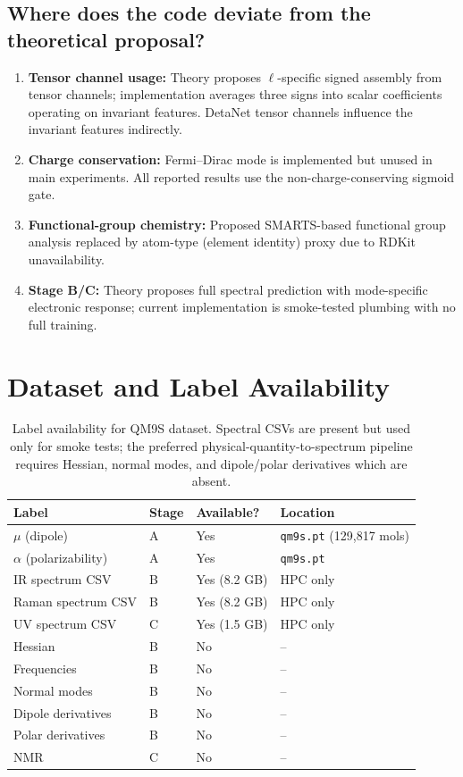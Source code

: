 \documentclass[11pt,a4paper]{article}
\begin{document}
\subsection{Where does the code deviate from the theoretical proposal?}
\begin{enumerate}[nosep]
    \item \textbf{Tensor channel usage:} Theory proposes $\ell$-specific signed assembly from tensor channels; implementation averages three signs into scalar coefficients operating on invariant features. DetaNet tensor channels influence the invariant features indirectly.
    \item \textbf{Charge conservation:} Fermi--Dirac mode is implemented but unused in main experiments. All reported results use the non-charge-conserving sigmoid gate.
    \item \textbf{Functional-group chemistry:} Proposed SMARTS-based functional group analysis replaced by atom-type (element identity) proxy due to RDKit unavailability.
    \item \textbf{Stage B/C:} Theory proposes full spectral prediction with mode-specific electronic response; current implementation is smoke-tested plumbing with no full training.
\end{enumerate}

\section{Dataset and Label Availability}

\begin{table}[ht]
\centering
\begin{tabular}{llll}
\toprule
\textbf{Label}        & \textbf{Stage} & \textbf{Available?} & \textbf{Location}          \\
\midrule
$\mu$ (dipole)       & A  & Yes & \texttt{qm9s.pt} (129,817 mols) \\
$\alpha$ (polarizability) & A & Yes & \texttt{qm9s.pt} \\
IR spectrum CSV       & B  & Yes (8.2 GB) & HPC only \\
Raman spectrum CSV    & B  & Yes (8.2 GB) & HPC only \\
UV spectrum CSV       & C  & Yes (1.5 GB) & HPC only \\
Hessian               & B  & No  & -- \\
Frequencies           & B  & No  & -- \\
Normal modes          & B  & No  & -- \\
Dipole derivatives    & B  & No  & -- \\
Polar derivatives     & B  & No  & -- \\
NMR                   & C  & No  & -- \\
\bottomrule
\end{tabular}
\caption{Label availability for QM9S dataset. Spectral CSVs are present but used only for smoke tests; the preferred physical-quantity-to-spectrum pipeline requires Hessian, normal modes, and dipole/polar derivatives which are absent.}
\end{table}
\end{document}

